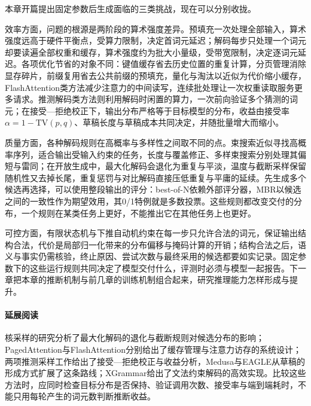 本章开篇提出固定参数后生成面临的三类挑战，现在可以分别收拢。

效率方面，问题的根源是两阶段的算术强度差异。预填充一次处理全部输入，算术强度远高于硬件平衡点，受算力限制，决定首词元延迟；解码每步只处理一个词元却要读遍全部权重和缓存，算术强度约为批大小量级，受带宽限制，决定逐词元延迟。各项优化节省的对象不同：键值缓存省去历史位置的重复计算，分页管理消除显存碎片，前缀复用省去公共前缀的预填充，量化与淘汰以近似为代价缩小缓存，FlashAttention类方法减少注意力的中间读写，连续批处理让一次权重读取服务更多请求。推测解码类方法则利用解码时闲置的算力，一次前向验证多个猜测的词元；在接受—拒绝校正下，输出分布严格等于目标模型的分布，收益由接受率$\alpha=1-\mathrm{TV}(p,q)$、草稿长度与草稿成本共同决定，并随批量增大而缩小。

质量方面，各种解码规则在高概率与多样性之间取不同的点。束搜索近似寻找高概率序列，适合输出受输入约束的任务，长度与覆盖修正、多样束搜索分别处理其偏短与雷同；在开放生成中，最大化解码会退化为重复与平淡，温度与截断采样保留随机性又去掉长尾，重复惩罚与对比解码直接压低重复与平庸的延续。先生成多个候选再选择，可以使用整段输出的评分：best-of-N依赖外部评分器，MBR以候选之间的一致性作为期望效用，其0/1特例就是多数投票。这些规则都改变交付的分布，一个规则在某类任务上更好，不能推出它在其他任务上也更好。

可控方面，有限状态机与下推自动机约束在每一步只允许合法的词元，保证输出结构合法，代价是局部归一化带来的分布偏移与掩码计算的开销；结构合法之后，语义与事实仍需核验，终止原因、尝试次数与最终采用的候选都要如实记录。固定参数下的这些运行规则共同决定了模型交付什么，评测时必须与模型一起报告。下一章把本章的推断机制与前几章的训练机制组合起来，研究推理能力怎样形成与提升。

\paragraph{延展阅读}
核采样的研究分析了最大化解码的退化与截断规则对候选分布的影响；PagedAttention与FlashAttention分别给出了缓存管理与注意力访存的系统设计；两项推测采样工作给出了接受—拒绝校正与收益分析，Medusa与EAGLE从草稿的形成方式扩展了这条路线；XGrammar给出了文法约束解码的高效实现。比较这些方法时，应同时检查目标分布是否保持、验证调用次数、接受率与端到端耗时，不能只用每轮产生的词元数判断推断收益。
